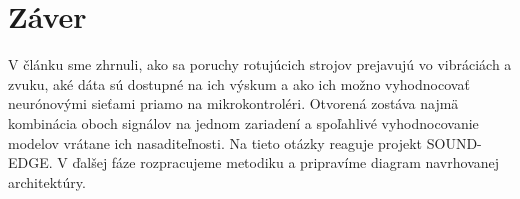 \documentclass[10pt,twoside,slovak,a4paper]{article}
\begin{document}



\section{Záver} \label{zaver}

V článku sme zhrnuli, ako sa poruchy rotujúcich strojov prejavujú vo vibráciách a zvuku, aké dáta sú dostupné na ich výskum a ako ich možno vyhodnocovať neurónovými sieťami priamo na mikrokontroléri. Otvorená zostáva najmä kombinácia oboch signálov na jednom zariadení a spoľahlivé vyhodnocovanie modelov vrátane ich nasaditeľnosti. Na tieto otázky reaguje projekt SOUND-EDGE. V ďalšej fáze rozpracujeme metodiku a pripravíme diagram navrhovanej architektúry.



\end{document}
